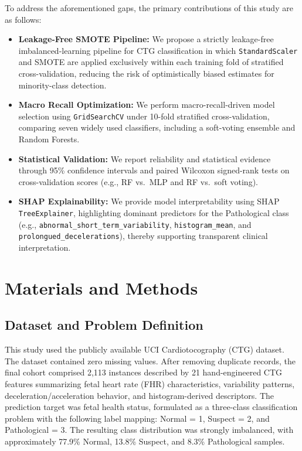 \documentclass[sigconf]{acmart}
\begin{document}
To address the aforementioned gaps, the primary contributions of this study are as follows:
\begin{itemize}
    \item \textbf{Leakage-Free SMOTE Pipeline:} We propose a strictly leakage-free imbalanced-learning pipeline for CTG classification in which \texttt{StandardScaler} and SMOTE are applied exclusively within each training fold of stratified cross-validation, reducing the risk of optimistically biased estimates for minority-class detection.
    \item \textbf{Macro Recall Optimization:} We perform macro-recall-driven model selection using \texttt{GridSearchCV} under 10-fold stratified cross-validation, comparing seven widely used classifiers, including a soft-voting ensemble and Random Forests.
    \item \textbf{Statistical Validation:} We report reliability and statistical evidence through 95\% confidence intervals and paired Wilcoxon signed-rank tests on cross-validation scores (e.g., RF vs.\ MLP and RF vs.\ soft voting).
    \item \textbf{SHAP Explainability:} We provide model interpretability using SHAP \texttt{TreeExplainer}, highlighting dominant predictors for the Pathological class (e.g., \texttt{abnormal\_\allowbreak short\_\allowbreak term\_\allowbreak variability}, \texttt{histogram\_\allowbreak mean}, and \texttt{prolongued\_\allowbreak decelerations}), thereby supporting transparent clinical interpretation.
\end{itemize}
\section{Materials and Methods}
\label{sec:methods}

\subsection{Dataset and Problem Definition}
\label{subsec:dataset}

This study used the publicly available UCI Cardiotocography (CTG) dataset. The dataset contained zero missing values. After removing duplicate records, the final cohort comprised 2,113 instances described by 21 hand-engineered CTG features summarizing fetal heart rate (FHR) characteristics, variability patterns, deceleration/acceleration behavior, and histogram-derived descriptors. The prediction target was fetal health status, formulated as a three-class classification problem with the following label mapping: Normal = 1, Suspect = 2, and Pathological = 3. The resulting class distribution was strongly imbalanced, with approximately 77.9\% Normal, 13.8\% Suspect, and 8.3\% Pathological samples.
\end{document}
